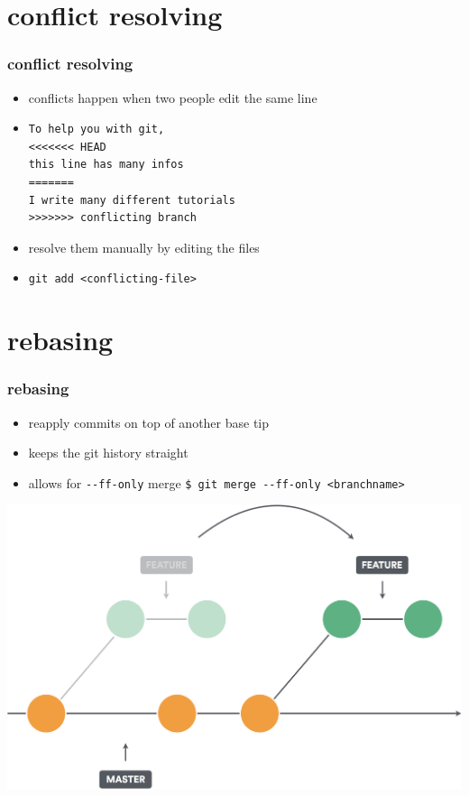 \documentclass{beamer}
\begin{document}
	\section{conflict resolving}
	\begin{frame}[fragile]
		\frametitle{conflict resolving}\pause
		\begin{itemize}
			\item conflicts happen when two people edit the same line\pause
			\item[] 
			\begin{lstlisting}
To help you with git,
<<<<<<< HEAD
this line has many infos
=======
I write many different tutorials
>>>>>>> conflicting branch
			\end{lstlisting}
			\item resolve them manually by editing the files\pause\newline
			\item \lstinline|git add <conflicting-file>|
		\end{itemize}
	\end{frame}
	
	\section{rebasing}
	\begin{frame}
		\frametitle{rebasing}\pause
		\begin{itemize}
			\item reapply commits on top of another base tip\pause
			\item keeps the git history straight\pause
			\item allows for \lstinline|--ff-only| merge\newline
			\lstinline|$ git merge --ff-only <branchname>| \pause
		\end{itemize}
		\includegraphics[width=.725\linewidth]{gitrebase.png}
	\end{frame}
	
\end{document}
